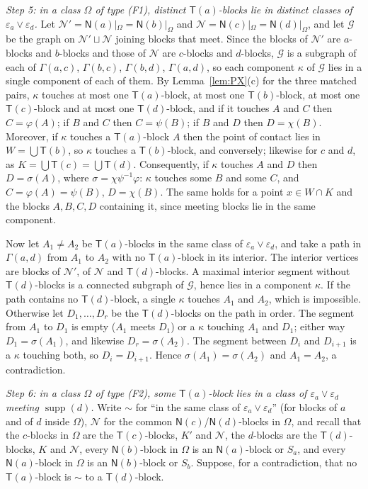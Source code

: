 \documentclass[11pt]{amsart}
\theoremstyle{definition}
\newcommand{\supp}{\operatorname{supp}}
\newcommand{\T}{\mathsf{T}}
\newcommand{\N}{\mathsf{N}}
\begin{document}
\smallskip
\emph{Step 5: in a class $\Omega$ of type \textup{(F1)}, distinct $\T(a)$-blocks lie in distinct classes of $\varepsilon_a\vee\varepsilon_d$.} Let $\mathcal N'=\N(a)|_\Omega=\N(b)|_\Omega$ and $\mathcal N=\N(c)|_\Omega=\N(d)|_\Omega$, and let $\mathcal G$ be the graph on $\mathcal N'\sqcup\mathcal N$ joining blocks that meet. Since the blocks of $\mathcal N'$ are $a$-blocks and $b$-blocks and those of $\mathcal N$ are $c$-blocks and $d$-blocks, $\mathcal G$ is a subgraph of each of $\Gamma(a,c)$, $\Gamma(b,c)$, $\Gamma(b,d)$, $\Gamma(a,d)$, so each component $\kappa$ of $\mathcal G$ lies in a single component of each of them. By Lemma~\ref{lem:PX}(c) for the three matched pairs, $\kappa$ touches at most one $\T(a)$-block, at most one $\T(b)$-block, at most one $\T(c)$-block and at most one $\T(d)$-block, and if it touches $A$ and $C$ then $C=\varphi(A)$; if $B$ and $C$ then $C=\psi(B)$; if $B$ and $D$ then $D=\chi(B)$. Moreover, if $\kappa$ touches a $\T(a)$-block $A$ then the point of contact lies in $W=\bigcup\T(b)$, so $\kappa$ touches a $\T(b)$-block, and conversely; likewise for $c$ and $d$, as $K=\bigcup\T(c)=\bigcup\T(d)$. Consequently, if $\kappa$ touches $A$ and $D$ then $D=\sigma(A)$, where $\sigma=\chi\psi^{-1}\varphi$: $\kappa$ touches some $B$ and some $C$, and $C=\varphi(A)=\psi(B)$, $D=\chi(B)$. The same holds for a point $x\in W\cap K$ and the blocks $A,B,C,D$ containing it, since meeting blocks lie in the same component.

Now let $A_1\ne A_2$ be $\T(a)$-blocks in the same class of $\varepsilon_a\vee\varepsilon_d$, and take a path in $\Gamma(a,d)$ from $A_1$ to $A_2$ with no $\T(a)$-block in its interior. The interior vertices are blocks of $\mathcal N'$, of $\mathcal N$ and $\T(d)$-blocks. A maximal interior segment without $\T(d)$-blocks is a connected subgraph of $\mathcal G$, hence lies in a component $\kappa$. If the path contains no $\T(d)$-block, a single $\kappa$ touches $A_1$ and $A_2$, which is impossible. Otherwise let $D_1,\dots,D_r$ be the $\T(d)$-blocks on the path in order. The segment from $A_1$ to $D_1$ is empty ($A_1$ meets $D_1$) or a $\kappa$ touching $A_1$ and $D_1$; either way $D_1=\sigma(A_1)$, and likewise $D_r=\sigma(A_2)$. The segment between $D_i$ and $D_{i+1}$ is a $\kappa$ touching both, so $D_i=D_{i+1}$. Hence $\sigma(A_1)=\sigma(A_2)$ and $A_1=A_2$, a contradiction.

\smallskip
\emph{Step 6: in a class $\Omega$ of type \textup{(F2)}, some $\T(a)$-block lies in a class of $\varepsilon_a\vee\varepsilon_d$ meeting $\supp(d)$.} Write $\sim$ for ``in the same class of $\varepsilon_a\vee\varepsilon_d$'' (for blocks of $a$ and of $d$ inside $\Omega$), $\mathcal N$ for the common $\N(c)$/$\N(d)$-blocks in $\Omega$, and recall that the $c$-blocks in $\Omega$ are the $\T(c)$-blocks, $K'$ and $\mathcal N$, the $d$-blocks are the $\T(d)$-blocks, $K$ and $\mathcal N$, every $\N(b)$-block in $\Omega$ is an $\N(a)$-block or $S_a$, and every $\N(a)$-block in $\Omega$ is an $\N(b)$-block or $S_b$. Suppose, for a contradiction, that no $\T(a)$-block is $\sim$ to a $\T(d)$-block.
\end{document}
